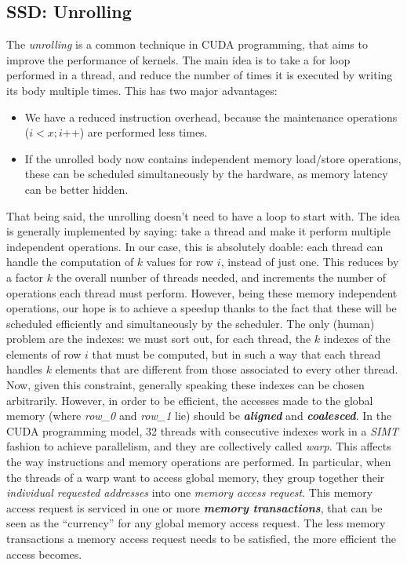 \documentclass[12pt]{extarticle}
\begin{document}
\subsection{SSD: Unrolling}
The \emph{unrolling} is a common technique in CUDA programming, that aims to improve the performance of kernels. The main idea is to take a for loop performed in a thread, and reduce the number of times it is executed by writing its body multiple times. This has two major advantages:
\begin{itemize}
    \item We have a reduced instruction overhead, because the maintenance operations ($i < x; i$++) are performed less times.
    \item If the unrolled body now contains independent memory load/store operations, these can be scheduled simultaneously by the hardware, as memory latency can be better hidden.
\end{itemize}
That being said, the unrolling doesn't need to have a loop to start with. The idea is generally implemented by saying: take a thread and make it perform multiple independent operations. In our case, this is absolutely doable: each thread can handle the computation of $k$ values for row $i$, instead of just one. This reduces by a factor $k$ the overall number of threads needed, and increments the number of operations each thread must perform. However, being these memory independent operations, our hope is to achieve a speedup thanks to the fact that these will be scheduled efficiently and simultaneously by the scheduler.\newline
The only (human) problem are the indexes: we must sort out, for each thread, the $k$ indexes of the elements of row $i$ that must be computed, but in such a way that each thread handles $k$ elements that are different from those associated to every other thread. Now, given this constraint, generally speaking these indexes can be chosen arbitrarily. However, in order to be efficient, the accesses made to the global memory (where \emph{row\_0} and \emph{row\_1} lie) should be \textbf{\emph{aligned}} and \textbf{\emph{coalesced}}.\newline
In the CUDA programming model, 32 threads with consecutive indexes work in a \emph{SIMT} fashion to achieve parallelism, and they are collectively called \emph{warp}. This affects the way instructions and memory operations are performed. In particular, when the threads of a warp want to access global memory, they group together their \emph{individual requested addresses} into one \emph{memory access request}. This memory access request is serviced in one or more \textbf{\emph{memory transactions}}, that can be seen as the ``currency'' for any global memory access request. The less memory transactions a memory access request needs to be satisfied, the more efficient the access becomes.\newline
\end{document}
